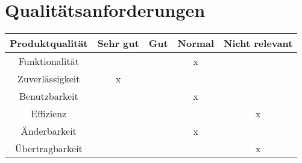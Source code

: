 \section{Qualitätsanforderungen}


\begin{tabular}{|c|c|c|c|c|}
	\hline Produktqualität & Sehr gut & Gut & Normal & Nicht relevant \\
	\hline Funktionalität  &          &     &   x    &                \\
	\hline Zuverlässigkeit &    x     &     &        &                \\
	\hline Benutzbarkeit   &          &     &   x    &                \\
	\hline Effizienz       &          &     &        &       x        \\
	\hline Änderbarkeit    &          &     &   x    &                \\
	\hline Übertragbarkeit &          &     &        &       x        \\
	\hline 
\end{tabular}